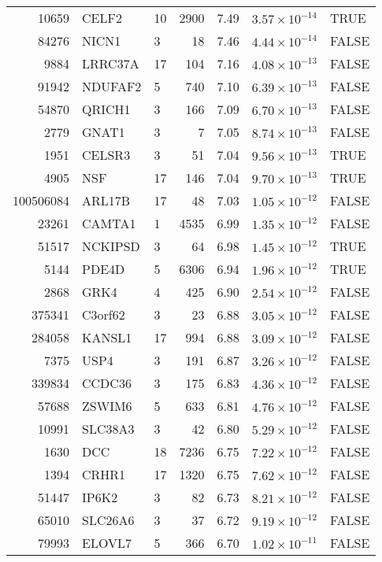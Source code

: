 \begin{table}[ht]
\begin{adjustbox}{totalheight=10in}
\begin{tabular}{rllrrrl}
  10659 & CELF2 & 10 & 2900 & 7.49 & $3.57 \times 10^{-14}$ & TRUE \\ 
  84276 & NICN1 & 3 &  18 & 7.46 & $4.44 \times 10^{-14}$ & FALSE \\ 
  9884 & LRRC37A & 17 & 104 & 7.16 & $4.08 \times 10^{-13}$ & FALSE \\ 
  91942 & NDUFAF2 & 5 & 740 & 7.10 & $6.39 \times 10^{-13}$ & FALSE \\ 
  54870 & QRICH1 & 3 & 166 & 7.09 & $6.70 \times 10^{-13}$ & FALSE \\ 
  2779 & GNAT1 & 3 &   7 & 7.05 & $8.74 \times 10^{-13}$ & FALSE \\ 
  1951 & CELSR3 & 3 &  51 & 7.04 & $9.56 \times 10^{-13}$ & TRUE \\ 
  4905 & NSF & 17 & 146 & 7.04 & $9.70 \times 10^{-13}$ & TRUE \\ 
  100506084 & ARL17B & 17 &  48 & 7.03 & $1.05 \times 10^{-12}$ & FALSE \\ 
  23261 & CAMTA1 & 1 & 4535 & 6.99 & $1.35 \times 10^{-12}$ & FALSE \\ 
  51517 & NCKIPSD & 3 &  64 & 6.98 & $1.45 \times 10^{-12}$ & TRUE \\ 
  5144 & PDE4D & 5 & 6306 & 6.94 & $1.96 \times 10^{-12}$ & TRUE \\ 
  2868 & GRK4 & 4 & 425 & 6.90 & $2.54 \times 10^{-12}$ & FALSE \\ 
  375341 & C3orf62 & 3 &  23 & 6.88 & $3.05 \times 10^{-12}$ & FALSE \\ 
  284058 & KANSL1 & 17 & 994 & 6.88 & $3.09 \times 10^{-12}$ & FALSE \\ 
  7375 & USP4 & 3 & 191 & 6.87 & $3.26 \times 10^{-12}$ & FALSE \\ 
  339834 & CCDC36 & 3 & 175 & 6.83 & $4.36 \times 10^{-12}$ & FALSE \\ 
  57688 & ZSWIM6 & 5 & 633 & 6.81 & $4.76 \times 10^{-12}$ & FALSE \\ 
  10991 & SLC38A3 & 3 &  42 & 6.80 & $5.29 \times 10^{-12}$ & FALSE \\ 
  1630 & DCC & 18 & 7236 & 6.75 & $7.22 \times 10^{-12}$ & FALSE \\ 
  1394 & CRHR1 & 17 & 1320 & 6.75 & $7.62 \times 10^{-12}$ & FALSE \\ 
  51447 & IP6K2 & 3 &  82 & 6.73 & $8.21 \times 10^{-12}$ & FALSE \\ 
  65010 & SLC26A6 & 3 &  37 & 6.72 & $9.19 \times 10^{-12}$ & FALSE \\ 
  79993 & ELOVL7 & 5 & 366 & 6.70 & $1.02 \times 10^{-11}$ & FALSE \\ 

\end{tabular}
\end{adjustbox}
\end{table}
